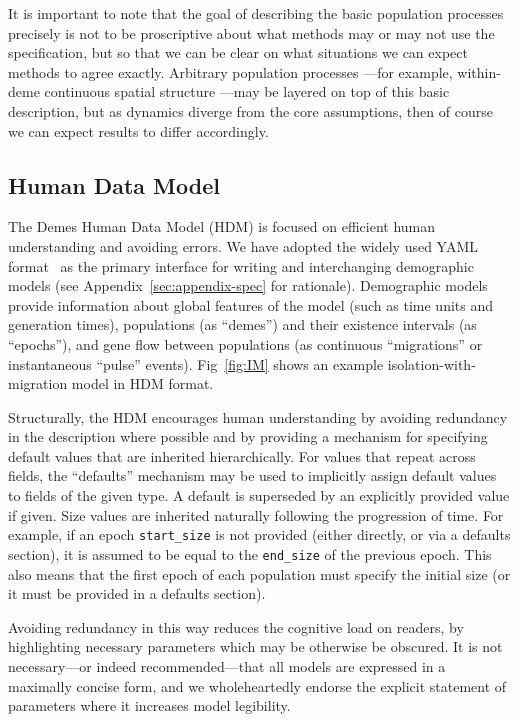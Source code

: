 \documentclass[11pt]{article}
\begin{document}
It is important to note that the goal of describing
the basic population processes precisely is not to be
proscriptive about what methods may or may not use the specification,
but so that we can be clear on what situations we can
expect methods to agree exactly. Arbitrary population
processes
---for example, within-deme
continuous spatial structure
\citep{wright1943isolation,barton2002neutral,barton2010new,
ringbauer2017inferring,battey2020space}---may
be layered on top of this basic description,
but as dynamics diverge from the core assumptions,
then of course we can expect results to differ
accordingly.

\subsection*{Human Data Model}

The Demes Human Data Model (HDM) is focused on efficient human
understanding and avoiding errors.
We have adopted the widely used YAML format~\citep{ben2009yaml} as the
primary interface for writing and interchanging demographic models
(see Appendix~\ref{sec:appendix-spec} for rationale).
Demographic models provide information about global
features of the model (such as time units and generation times),
populations (as ``demes'') and their existence intervals (as ``epochs''),
and gene flow between populations
(as continuous ``migrations'' or instantaneous ``pulse'' events).
Fig~\ref{fig:IM} shows an example isolation-with-migration model in HDM format.

Structurally, the HDM encourages human understanding
by avoiding redundancy in the description where possible and by providing a
mechanism for specifying default values that are inherited hierarchically.
For values that repeat
across fields, the ``defaults'' mechanism may be used to implicitly assign default values to
fields of the given type.  A default is superseded by an explicitly provided
value if given. Size values are inherited naturally following the
progression of time. For example, if an epoch \texttt{start\_size} is not
provided (either directly, or via a defaults section),
it is assumed to be equal to the \texttt{end\_size} of the previous
epoch. This also means that the first epoch of each population must specify the
initial size (or it must be provided in a defaults section).

Avoiding redundancy in this way reduces the cognitive load on readers,
by highlighting necessary parameters which may be otherwise be obscured.
It is not necessary---or indeed recommended---that all models are expressed
in a maximally concise form, and we wholeheartedly endorse
the explicit statement of parameters where it increases model legibility.
\end{document}
